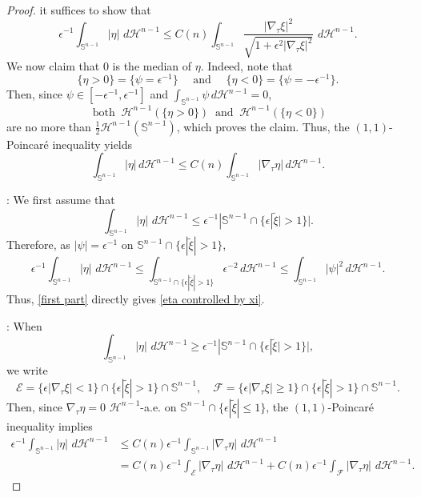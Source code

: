 \documentclass[reqno,11pt]{amsart}
\def\ez{\epsilon}
\numberwithin{equation}{section}
\theoremstyle{remark}
\begin{document}
\begin{proof}
it suffices to show that
\begin{equation} \label{eta controlled by xi}
\ez^{-1}\int_{\mathbb S^{n-1}} |\eta|  \, \,d\mathscr H^{n-1}\le C(n)\int_{\mathbb S^{n-1}}   \frac{|\nabla_\tau  \xi|^2}{\sqrt{1+\ez^2|\nabla_\tau \xi|^2}}  \, \,d\mathscr H^{n-1}.
\end{equation}
We now claim that $0$ is the median of $\eta$. Indeed, note that
$$
\{\eta>0\}=\{\psi= \epsilon^{-1}\} \quad \text{  and }\quad  \{\eta<0\}=\{\psi=-\epsilon^{-1}\}.
$$
Then, since $\psi\in [-\epsilon^{-1},  \epsilon^{-1}]$ and $\int_{\mathbb S^{n-1}}\psi\,d\mathscr H^{n-1}=0$,   
$$ \text{ both }  \ \mathscr H^{n-1}(\{\eta>0\}) \ \text{ and } \ \mathscr H^{n-1}(\{\eta<0\})$$ 
are no more than  $\frac 1 2\mathscr H^{n-1}(\mathbb S^{n-1})$, which proves the claim. Thus,  the $(1,1)$-Poincar\'e inequality yields
$$
\int_{\mathbb S^{n-1}} |\eta| \,d\mathscr H^{n-1}
\le C(n)\int_{\mathbb S^{n-1}} |\nabla_\tau\eta|\,d\mathscr H^{n-1}.
$$

\medskip
{}:
We first assume that
\begin{equation}\label{eta small}
\int_{\mathbb S^{n-1}} |\eta|  \, \,d\mathscr H^{n-1}\le \ez^{-1}|\mathbb S^{n-1}\cap \{\ez|\tilde\xi|>1\}|.
\end{equation}
Therefore, as $|\psi|=\ez^{-1}$ on $\mathbb S^{n-1}\cap\{\ez |\tilde\xi|> 1\}$,
\begin{equation}\label{eta small2}
\ez^{-1}\int_{\mathbb S^{n-1}} |\eta|  \, \,d\mathscr H^{n-1}\leq
\int_{\mathbb S^{n-1}\cap\{\ez|\tilde\xi|>1\}}  \ez^{-2} \,d\mathscr H^{n-1}\leq \int_{\mathbb S^{n-1}}  {|\psi|^2}  \,d\mathscr H^{n-1}.
\end{equation}
Thus, \eqref{first part} directly gives \eqref{eta controlled by xi}.

\medskip
{}:
When
\begin{equation}\label{eta large}
\int_{\mathbb S^{n-1}} |\eta|  \, \,d\mathscr H^{n-1}\ge \ez^{-1}|\mathbb S^{n-1}\cap\{\ez|\tilde\xi|>1\}|,
\end{equation}
we write
$$\mathcal E= \{\ez|\nabla_\tau\xi|<1\}\cap\{\ez|\tilde\xi|>1\}\cap\mathbb S^{n-1}, \quad  \mathcal F= \{\ez|\nabla_\tau\xi|\ge 1\}\cap\{\ez|\tilde\xi|>1\}\cap\mathbb S^{n-1}.$$
Then, since $\nabla_\tau\eta=0$ $\mathscr H^{n-1}$-a.e. on $\mathbb S^{n-1}\cap \{\ez|\tilde\xi|\leq  1\}$, the $(1,1)$-Poincar\'e inequality implies
\begin{equation}
    \begin{split}
\ez^{-1}\int_{\mathbb S^{n-1}} |\eta|  \, \,d\mathscr H^{n-1} & \leq  C(n) \ez^{-1} \int_{\mathbb S^{n-1} }  |\nabla_\tau \eta| \, \,d\mathscr H^{n-1}\\
& =  C(n) \ez^{-1} \int_{\mathcal E}  |\nabla_\tau \eta| \, \,d\mathscr H^{n-1}+ C(n) \ez^{-1} \int_{\mathcal F}  |\nabla_\tau \eta| \, \,d\mathscr H^{n-1}. \label{D eta}
    \end{split}
\end{equation}


\end{proof}
\end{document}
